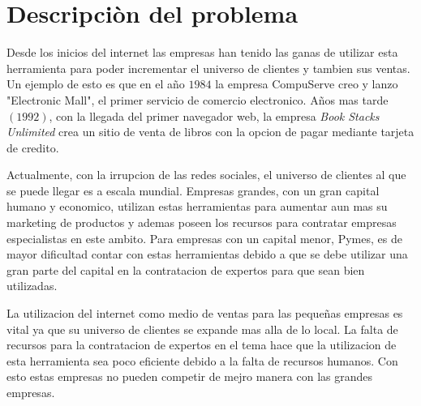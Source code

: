 \section{Descripciòn del problema}




Desde los inicios del internet las empresas han tenido las ganas de utilizar esta herramienta para poder 
incrementar el universo de clientes y tambien sus ventas. Un ejemplo de esto es que en el año $1984$ 
la empresa CompuServe creo y lanzo "Electronic Mall", el primer servicio de comercio electronico\cite{Def:1}. 
Años mas tarde$(1992)$, con la llegada del primer navegador web, la empresa \emph{Book Stacks Unlimited}
 crea un sitio de venta de libros con la opcion de pagar mediante tarjeta de credito.

Actualmente, con la irrupcion de las redes sociales, el universo de clientes al que se puede llegar es a escala 
mundial. Empresas grandes, con un gran capital humano y economico, utilizan estas herramientas para aumentar
aun mas su marketing de productos y ademas poseen los recursos para contratar empresas especialistas en este
ambito. Para empresas con un capital menor, Pymes, es de mayor dificultad contar con estas herramientas debido
a que se debe utilizar una gran parte del capital en la contratacion de expertos para que sean bien utilizadas.

La utilizacion del internet como medio de ventas para las pequeñas empresas es vital ya que su universo de clientes
se expande mas alla de lo local. La falta de recursos para la contratacion de expertos en el tema hace que la 
utilizacion de esta herramienta sea poco eficiente debido a la falta de recursos humanos. Con esto estas empresas
no pueden competir de mejro manera con las grandes empresas.




